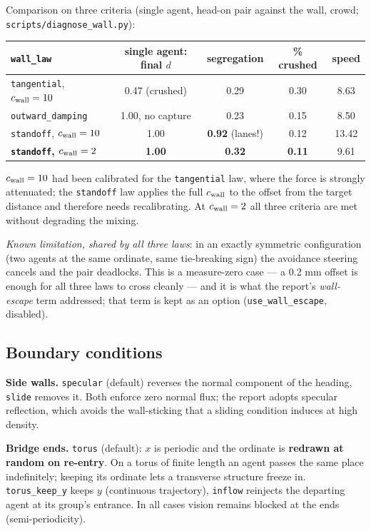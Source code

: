 \documentclass[11pt,a4paper]{article}
\newcommand{\code}[1]{\texttt{#1}}
\begin{document}
\medskip
\noindent Comparison on three criteria (single agent, head-on pair against the wall,
crowd; \code{scripts/diagnose\_wall.py}):

\begin{center}
\begin{tabular}{@{}lcccc@{}}
\toprule
\code{wall\_law} & single agent: final $d$ & segregation & \% crushed & speed \\
\midrule
\code{tangential}, $c_{\rm wall}=10$ & 0.47 (crushed) & 0.29 & 0.30 & 8.63 \\
\code{outward\_damping} & 1.00, no capture & 0.23 & 0.15 & 8.50 \\
\code{standoff}, $c_{\rm wall}=10$ & 1.00 & \textbf{0.92} (lanes!) & 0.12 & 13.42 \\
\textbf{\code{standoff}, $c_{\rm wall}=2$} & \textbf{1.00} & \textbf{0.32} & \textbf{0.11} & 9.61 \\
\bottomrule
\end{tabular}
\end{center}

$c_{\rm wall}=10$ had been calibrated for the \code{tangential} law, where the
force is strongly attenuated; the \code{standoff} law applies the full
$c_{\rm wall}$ to the offset from the target distance and therefore needs
recalibrating. At $c_{\rm wall}=2$ all three criteria are met without degrading
the mixing.

\emph{Known limitation, shared by all three laws}: in an exactly symmetric
configuration (two agents at the same ordinate, same tie-breaking sign) the
avoidance steering cancels and the pair deadlocks. This is a measure-zero case
--- a 0.2 mm offset is enough for all three laws to cross cleanly --- and it is
what the report's \emph{wall-escape} term addressed; that term is kept as an
option (\code{use\_wall\_escape}, disabled).

\subsection{Boundary conditions}

\textbf{Side walls.} \code{specular} (default) reverses the normal component of
the heading, \code{slide} removes it. Both enforce zero normal flux; the report
adopts specular reflection, which avoids the wall-sticking that a sliding
condition induces at high density.

\textbf{Bridge ends.} \code{torus} (default): $x$ is periodic and the ordinate
is \textbf{redrawn at random on re-entry}. On a torus of finite length an agent
passes the same place indefinitely; keeping its ordinate lets a transverse
structure freeze in. \code{torus\_keep\_y} keeps $y$ (continuous trajectory),
\code{inflow} reinjects the departing agent at its group's entrance. In all
cases vision remains blocked at the ends (semi-periodicity).
\end{document}
